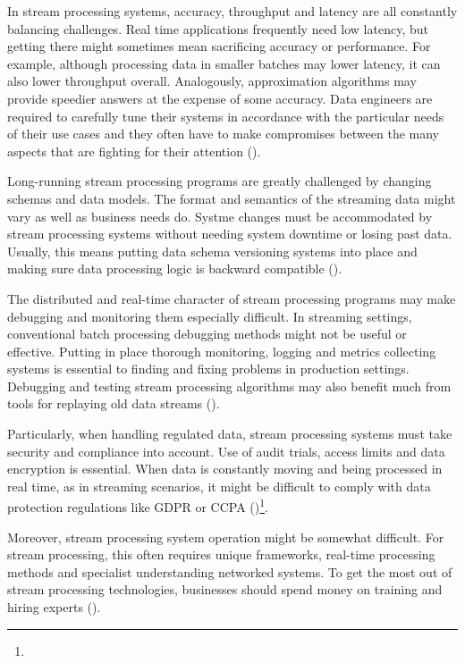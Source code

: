 In stream processing systems, accuracy, throughput and latency are all constantly balancing challenges. Real time applications frequently need low latency, but getting there might sometimes mean sacrificing accuracy or performance. For example, although processing data in smaller batches may lower latency, it can also lower throughput overall. Analogously, approximation algorithms may provide speedier answers at the expense of some accuracy. Data engineers are required to carefully tune their systems in accordance with the particular needs of their use cases and they often have to make compromises between the many aspects that are fighting for their attention (\cite{fragkoulisSurveyEvolutionStream2023})\footnotemark[43].

Long-running stream processing programs are greatly challenged by changing schemas and data models. The format and semantics of the streaming data might vary as well as business needs do. Systme changes must be accommodated by stream processing systems without needing system downtime or losing past data. Usually, this means putting data schema versioning systems into place and making sure data processing logic is backward compatible (\cite{fragkoulisSurveyEvolutionStream2023})\footnotemark[43].

The distributed and real-time character of stream processing programs may make debugging and monitoring them especially difficult. In streaming settings, conventional batch processing debugging methods might not be useful or effective. Putting in place thorough monitoring, logging and metrics collecting systems is essential to finding and fixing problems in production settings. Debugging and testing stream processing algorithms may also benefit much from tools for replaying old data streams (\cite{fragkoulisSurveyEvolutionStream2023})\footnotemark[43].

Particularly, when handling regulated data, stream processing systems must take security and compliance into account. Use of audit trials, access limits and data encryption is essential. When data is constantly moving and being processed in real time, as in streaming scenarios, it might be difficult to comply with data protection regulations like GDPR or CCPA (\cite{ounacerRealtimeDataStream2017})\footnote[42]{}.

Moreover, stream processing system operation might be somewhat difficult. For stream processing, this often requires unique frameworks, real-time processing methods and specialist understanding networked systems. To get the most out of stream processing technologies, businesses should spend money on training and hiring experts (\cite{fragkoulisSurveyEvolutionStream2023})\footnotemark[43].

